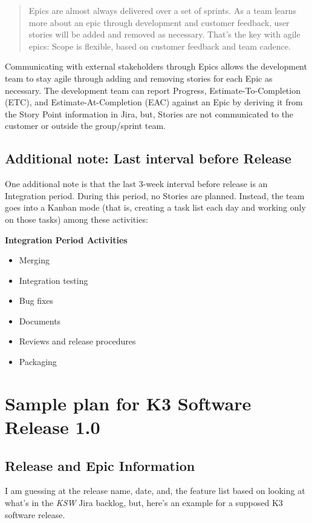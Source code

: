 \documentclass[letterpaper,11pt]{texMemo} %
\begin{document}
\begin{quote}
Epics are almost always delivered over a set of sprints. As a team learns more about an epic through development and customer feedback, user stories will be added and removed as necessary. That’s the key with agile epics: Scope is flexible, based on customer feedback and team cadence.
\end{quote}

Communicating with external stakeholders through Epics allows the development team to stay agile through adding and removing stories for each Epic as necessary.  The development team can report Progress, Estimate-To-Completion (ETC), and Estimate-At-Completion (EAC) against an Epic by deriving it from the Story Point information in Jira, but, Stories are not communicated to the customer or outside the group/sprint team.

\subsection*{Additional note: Last interval before Release}
One additional note is that the last 3-week interval before release is an Integration period. During this period, no Stories are planned.  Instead, the team goes into a Kanban mode (that is, creating a task list each day and working only on those tasks) among these activities:

\textbf{Integration Period Activities}
\begin{itemize}
[noitemsep]
\item Merging
\item Integration testing
\item Bug fixes
\item Documents
\item Reviews and release procedures
\item Packaging
\end{itemize}


\newpage
\section*{Sample plan for K3 Software Release 1.0}

\subsection*{Release and Epic Information}
I am guessing at the release name, date, and, the feature list based on looking at what's in the \emph{KSW} Jira backlog, but, here's an example for a supposed K3 software release.
\end{document}
